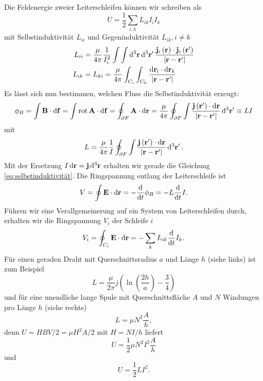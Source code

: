 Die Feldenergie zweier Leiterschleifen können wir schreiben als
\begin{equation*}
	U=\frac{1}{2}\sum _{i,k}L_{ik}I_{i}I_{k}
\end{equation*}
mit Selbstinduktivität $L_{ii}$ und Gegeninduktivität  $L_{ik},i\neq k$
\begin{align}
	\label{eq:selbstinduktivität}
	L_{ii} & =\frac{\mu }{4\pi }\frac{1}{I_{i}^{2}}\int \int \diffa[3]{\vec{r}}\diffa[3]{\vec{r}'}\frac{\vec {j}_{i}\left(\vec {r}\right)\cdot \vec {j}_{i}\left(\vec {r}'\right)}{\left| \vec {r}-\vec {r}'\right| } \\
	L_{ik} & =L_{ki}=\frac{\mu }{4\pi }\int _{C_{i}}\int _{C_{k}}\frac{\diff \vec {r}_{\mathrm{i}}\cdot \diff \vec {r}_{k}}{\left| \vec {r}-\vec {r}'\right| }
\end{align}
Es lässt sich nun bestimmen, welchen Fluss die Selbstinduktivität erzeugt:
\begin{equation*}
	\phi _{B}=\int \vec {B}\cdot \diff \vec {f}=\int \rot \vec {A}\cdot \diff \vec {f}=\oint _{\partial F}\vec {A}\cdot \diff \vec {r}=\frac{\mu }{4\pi }\oint _{\partial F}\int \frac{\vec {j}\left(\vec {r}'\right)\cdot \diff \vec {r}}{\left| \vec {r}-\vec {r}'\right| }\diffa[3]{\vec{r}'}\equiv LI
\end{equation*}
mit
\begin{equation*}
	L=\frac{\mu }{4\pi }\frac{1}{I}\oint _{\partial F}\int \frac{\vec {j}\left(\vec {r}'\right)\cdot \diff \vec {r}}{\left| \vec {r}-\vec {r}'\right| }\diffa[3]{\vec{r}'}.
\end{equation*}
Mit der Ersetzung $I\diff \vec {r}=\vec {j}\diffa[3]{\vec{r}}$ erhalten wir gerade die Gleichung \eqref{eq:selbstinduktivität}. Die Ringspannung entlang der Leiterschleife ist
\begin{equation*}
	V=\oint \vec {E}\cdot \diff \vec {r}=-\frac{\diff }{\diff t}\phi _{B}=-L\frac{\diff }{\diff t}I.
\end{equation*}
Führen wir eine Verallgemeinerung auf ein System von Leiterschleifen durch, erhalten wir die Ringspannung $V_{i}$ der Schleife $i$
\begin{equation*}
	V_{i}=\oint _{C_{i}}\vec {E}\cdot \diff \vec {r}=-\sum _{k}L_{ik}\frac{\diff }{\diff t}I_{k}.
\end{equation*}
Für einen geraden Draht mit Querschnittsradius $a$ und Länge $h$ (siehe  links) ist zum Beispiel
\begin{equation*}
	L=\frac{\mu }{2\pi }j\left(\ln \left(\frac{2h}{a}\right)-\frac{3}{4}\right)
\end{equation*}
und für eine unendliche lange Spule mit Querschnittsfläche $A$ und $N$ Windungen pro Länge $h$ (siehe  rechts)
\begin{equation*}
	L=\mu N^{2}\frac{A}{h},
\end{equation*}
denn $U=HBV/2=\mu H^{2}A/2$ mit $H=NI/h$ liefert
\begin{equation*}
	U=\frac{1}{2}\mu N^{2}I^{2}\frac{A}{h}
\end{equation*}
und
\begin{equation*}
	U=\frac{1}{2}LI^{2}.
\end{equation*}

